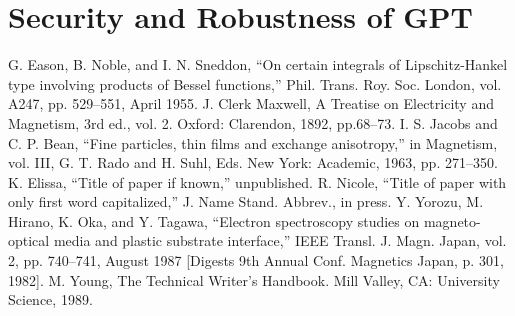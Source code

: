 \documentclass[conference]{IEEEtran}
\begin{document}
\section{Security and Robustness of GPT}








\begin{thebibliography}{00}
 G. Eason, B. Noble, and I. N. Sneddon, ``On certain integrals of Lipschitz-Hankel type involving products of Bessel functions,'' Phil. Trans. Roy. Soc. London, vol. A247, pp. 529--551, April 1955.
 J. Clerk Maxwell, A Treatise on Electricity and Magnetism, 3rd ed., vol. 2. Oxford: Clarendon, 1892, pp.68--73.
 I. S. Jacobs and C. P. Bean, ``Fine particles, thin films and exchange anisotropy,'' in Magnetism, vol. III, G. T. Rado and H. Suhl, Eds. New York: Academic, 1963, pp. 271--350.
 K. Elissa, ``Title of paper if known,'' unpublished.
 R. Nicole, ``Title of paper with only first word capitalized,'' J. Name Stand. Abbrev., in press.
 Y. Yorozu, M. Hirano, K. Oka, and Y. Tagawa, ``Electron spectroscopy studies on magneto-optical media and plastic substrate interface,'' IEEE Transl. J. Magn. Japan, vol. 2, pp. 740--741, August 1987 [Digests 9th Annual Conf. Magnetics Japan, p. 301, 1982].
 M. Young, The Technical Writer's Handbook. Mill Valley, CA: University Science, 1989.
\end{thebibliography}
\vspace{12pt}
\end{document}
